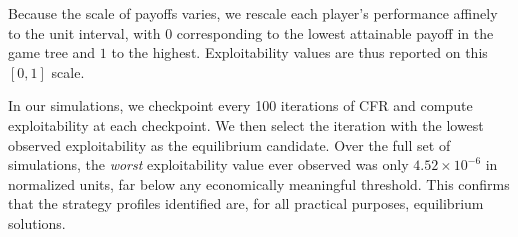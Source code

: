 \documentclass{article}
\begin{document}
Because the scale of payoffs varies, we rescale each player’s performance 
affinely to the unit interval, with $0$ corresponding to the lowest attainable 
payoff in the game tree and $1$ to the highest. Exploitability values are thus 
reported on this $[0,1]$ scale.

In our simulations, we checkpoint every 100 iterations of CFR and compute 
exploitability at each checkpoint. We then select the iteration with the lowest 
observed exploitability as the equilibrium candidate. Over the full set of 
simulations, the \emph{worst} exploitability value ever observed was only 
$4.52 \times 10^{-6}$ in normalized units, far below any economically meaningful 
threshold. This confirms that the strategy profiles identified are, for all 
practical purposes, equilibrium solutions.


\printbibliography
\end{document}
